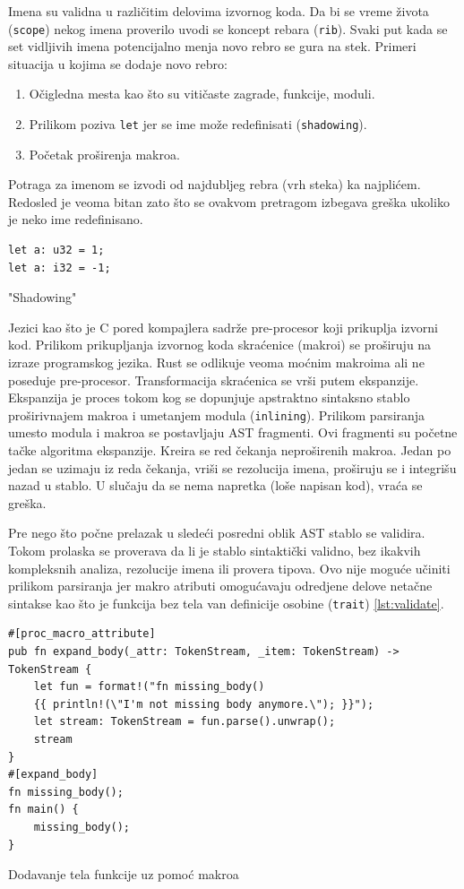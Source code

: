 \documentclass[11pt]{article}
\begin{document}
Imena su validna u različitim delovima izvornog koda. Da bi se 
vreme života (\verb|scope|) nekog imena proverilo uvodi se koncept rebara (\verb|rib|). Svaki put kada se 
set vidljivih imena potencijalno menja novo rebro se gura na stek. Primeri situacija u kojima se dodaje 
novo rebro:
\begin{enumerate}
    \item Očigledna mesta kao što su vitičaste zagrade, funkcije, moduli.
    \item Prilikom poziva \verb|let| jer se ime može redefinisati (\verb|shadowing|).
    \item Početak proširenja makroa. 
\end{enumerate}
Potraga za imenom se izvodi od najdubljeg rebra (vrh steka) ka najplićem. 
Redosled je veoma bitan zato što se ovakvom pretragom izbegava greška 
ukoliko je neko ime redefinisano.

\begin{listing}[H]
\begin{verbatim}
let a: u32 = 1;
let a: i32 = -1;
\end{verbatim}
\caption{"Shadowing"}
\label{lst:shadowing}
\end{listing}

Jezici kao što je C pored kompajlera sadrže pre-procesor koji prikuplja izvorni kod. 
Prilikom prikupljanja izvornog koda skraćenice (makroi) se proširuju na izraze programskog jezika. 
Rust se odlikuje veoma moćnim makroima ali ne poseduje pre-procesor. Transformacija skraćenica se vrši 
putem ekspanzije.  Ekspanzija je proces tokom kog se dopunjuje apstraktno sintaksno stablo
proširivnajem makroa i umetanjem modula (\verb|inlining|). Prilikom parsiranja umesto 
modula i makroa se postavljaju AST fragmenti. Ovi fragmenti su početne tačke algoritma ekspanzije.
Kreira se red čekanja neproširenih makroa. Jedan po jedan se uzimaju iz reda čekanja, vriši se rezolucija imena,
proširuju se i integrišu nazad u stablo. U slučaju da se nema napretka (loše napisan kod), vraća se greška.

Pre nego što počne prelazak u sledeći posredni oblik AST stablo se validira. 
Tokom prolaska se proverava da li je stablo sintaktički validno, bez ikakvih kompleksnih analiza,
rezolucije imena ili provera tipova. Ovo nije moguće učiniti prilikom parsiranja jer makro atributi 
omogućavaju odredjene delove netačne sintakse kao što je funkcija bez tela van definicije osobine (\verb|trait|) \ref{lst:validate}.

\begin{listing}[H]
\begin{verbatim}
#[proc_macro_attribute]
pub fn expand_body(_attr: TokenStream, _item: TokenStream) -> TokenStream {
    let fun = format!("fn missing_body() 
    {{ println!(\"I'm not missing body anymore.\"); }}");
    let stream: TokenStream = fun.parse().unwrap();
    stream
}
#[expand_body]
fn missing_body();
fn main() {
    missing_body();
}
\end{verbatim}
\caption{Dodavanje tela funkcije uz pomoć makroa}
\label{lst:validate}
\end{listing}
\end{document}

